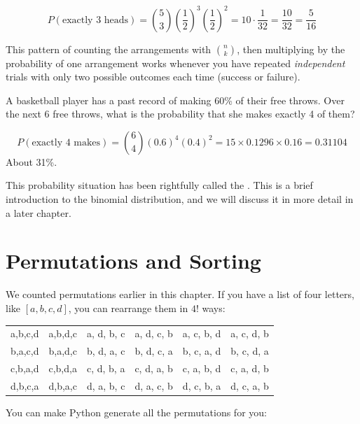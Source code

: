 $$P(\text{exactly 3 heads}) = \binom{5}{3}\left(\frac{1}{2}\right)^3\left(\frac{1}{2}\right)^2 = 10 \cdot \frac{1}{32} = \frac{10}{32} = \frac{5}{16}$$

This pattern of counting the arrangements with $\binom{n}{k}$, then multiplying by the probability of one arrangement works whenever you have repeated \emph{independent} trials with only two possible outcomes each time (success or failure). 

\begin{Exercise}[title={Free Throws}, label={ex:free_throw_prob}]
A basketball player has a past record of making 60\% of their free throws. Over the next 6 free throws, what is the probability that she makes exactly 4 of them?
\end{Exercise}


\begin{Answer}[ref={ex:free_throw_prob}]

\[
P(\text{exactly 4 makes}) = \binom{6}{4}(0.6)^4(0.4)^2 = 15 \times 0.1296 \times 0.16 = 0.31104
\]
About 31\%.

\end{Answer}
This probability situation has been rightfully called the . This is a brief introduction to the binomial distribution, and we will discuss it in more detail in a later chapter.


\section{Permutations and Sorting}
We counted permutations earlier in this chapter. If you have a list
of four letters, like $[a, b, c, d]$, you can rearrange them in $4!$
ways:

\begin{tabular}{c c c c c c}
  a,b,c,d & a,b,d,c & a, d, b, c & a, d, c, b & a, c, b, d & a, c, d, b \\
  b,a,c,d & b,a,d,c & b, d, a, c & b, d, c, a & b, c, a, d & b, c, d, a \\
  c,b,a,d & c,b,d,a & c, d, b, a & c, d, a, b & c, a, b, d & c, a, d, b \\
  d,b,c,a & d,b,a,c & d, a, b, c & d, a, c, b & d, c, b, a & d, c, a, b
\end{tabular}

You can make Python generate all the permutations for you:

